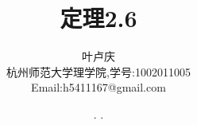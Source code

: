 \documentclass[a4paper, 12pt]{article} %
\makeatletter
\renewcommand{\maketitle}{ %
  \renewcommand\refname{参考文献}
  \newcommand{\D}{\displaystyle}\newcommand{\ri}{\Rightarrow}
  \newcommand{\ds}{\displaystyle} \renewcommand{\ni}{\noindent}
  \newcommand{\pa}{\partial} \newcommand{\Om}{\Omega}
  \newcommand{\om}{\omega} \newcommand{\sik}{\sum_{i=1}^k}
  \newcommand{\vov}{\Vert\omega\Vert} \newcommand{\Umy}{U_{\mu_i,y^i}}
  \newcommand{\lamns}{\lambda_n^{^{\scriptstyle\sigma}}}
  \newcommand{\chiomn}{\chi_{_{\Omega_n}}}
  \newcommand{\ullim}{\underline{\lim}} \newcommand{\bsy}{\boldsymbol}
  \newcommand{\mvb}{\mathversion{bold}} \newcommand{\la}{\lambda}
  \newcommand{\La}{\Lambda} \newcommand{\va}{\varepsilon}
  \newcommand{\be}{\beta} \newcommand{\al}{\alpha}
  \newcommand{\dis}{\displaystyle} \newcommand{\R}{{\mathbb R}}
  \newcommand{\N}{{\mathbb N}} \newcommand{\cF}{{\mathcal F}}
  \newcommand{\gB}{{\mathfrak B}} \newcommand{\eps}{\epsilon}
  \begin{flushright} %
    {\LARGE\@title} %
    
    \vspace{50pt} %
    
    {\large\@author} %
    \\\@date %
    
    \vspace{40pt} %
  \end{flushright}
}
\makeatother
\begin{document}
\begin{CJK}{UTF8}{gkai}
  \title{\textbf{定理2.6}} 
  \author{\small{叶卢庆}\\{\small{杭州师范大学理学院,学号:1002011005}}\\{\small{Email:h5411167@gmail.com}}} %
  \renewcommand{\today}{\number\year. \number\month. \number\day}
  \date{\today} %
  
  
  
  \maketitle %
  
  
  
  
  
  
  

\end{CJK}
\end{document}
